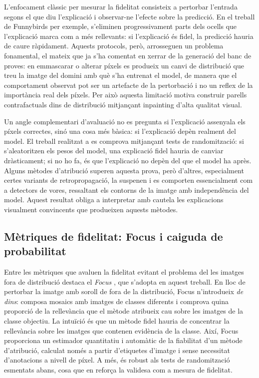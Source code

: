 L'enfocament clàssic per mesurar la fidelitat consisteix a pertorbar l'entrada segons el que diu l'explicació i observar-ne l'efecte sobre la predicció. En el treball de Funnybirds \cite{Hesse2023} per exemple, s'eliminen progressivament parts dels ocells que l'explicació marca com a més rellevants: si l'explicació és fidel, la predicció hauria de caure ràpidament. Aquests protocols, però, arrosseguen un problema fonamental, el mateix que ja s'ha comentat en xerrar de la generació del banc de proves: en emmascarar o alterar píxels es produeix un canvi de distribució que treu la imatge del domini amb què s'ha entrenat el model, de manera que el comportament observat pot ser un artefacte de la pertorbació i no un reflex de la importància real dels píxels. Per això aquesta limitació motiva construir parells contrafactuals dins de distribució mitjançant inpainting d'alta qualitat visual.

Un angle complementari d'avaluació no es pregunta si l'explicació assenyala els píxels correctes, sinó una cosa més bàsica: si l'explicació depèn realment del model. El treball realitzat a \cite{Adebayo2020} es comprova mitjançant tests de randomització: si s'aleatoritzen els pesos del model, una explicació fidel hauria de canviar dràsticament; si no ho fa, és que l'explicació no depèn del que el model ha après. Alguns mètodes d'atribució superen aquesta prova, però d'altres, especialment certes variants de retropropagació, la suspenen i es comporten essencialment com a detectors de vores, ressaltant els contorns de la imatge amb independència del model. Aquest resultat obliga a interpretar amb cautela les explicacions visualment convincents que produeixen aquests mètodes.

\subsection{Mètriques de fidelitat: Focus i caiguda de probabilitat}
Entre les mètriques que avaluen la fidelitat evitant el problema del les imatges fora de distribució destaca el \emph{Focus} \cite{Ariasduart2022}, que s'adopta en aquest treball. En lloc de pertorbar la imatge amb soroll de fora de la distribució, Focus n'introdueix \emph{de dins}: composa mosaics amb imatges de classes diferents i comprova quina proporció de la rellevància que el mètode atribueix cau sobre les imatges de la classe objectiu. La intuïció és que un mètode fidel hauria de concentrar la rellevància sobre les imatges que contenen evidència de la classe. Així, Focus proporciona un estimador quantitatiu i automàtic de la fiabilitat d'un mètode d'atribució, calculat només a partir d'etiquetes d'imatge i sense necessitat d'anotacions a nivell de píxel. A més, és robust als tests de randomització esmentats abans, cosa que en reforça la validesa com a mesura de fidelitat.

